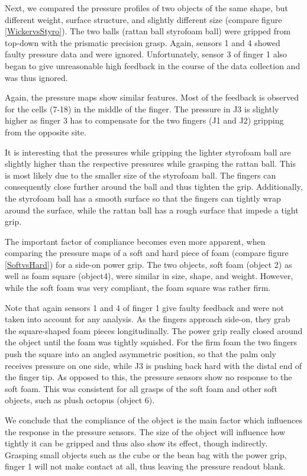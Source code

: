 Next, we compared the pressure profiles of two objects of the same shape, but different weight, surface structure, and slightly different size (compare figure \ref{WickervsStyro}). The two balls (rattan ball styrofoam ball) were gripped from top-down with the prismatic precision grasp. Again, sensors 1 and 4 showed faulty pressure data and were ignored. Unfortunately, sensor 3 of finger 1 also began to give unreasonable high feedback in the course of the data collection and was thus ignored. 

Again, the pressure maps show similar features. Most of the feedback is observed for the cells (7-18) in the middle of the finger. The pressure in J3 is slightly higher as finger 3 has to compensate for the two fingers (J1 and J2) gripping from the opposite site.  

It is interesting that the pressures while gripping the lighter styrofoam ball are slightly higher than the respective pressures while grasping the rattan ball. This is most likely due to the smaller size of the styrofoam ball. The fingers can consequently close further around the ball and thus tighten the grip. Additionally, the styrofoam ball has a smooth surface so that the fingers can tightly wrap around the surface, while the rattan ball has a rough surface that impede a tight grip.

The important factor of compliance becomes even more apparent, when comparing the pressure maps of a soft and hard piece of foam (compare figure \ref{SoftvsHard}) for a side-on power grip. The two objects, soft foam (object 2) as well as foam square (object4), were similar in size, shape, and weight. However, while the soft foam was very compliant, the foam square was rather firm. 

Note that again sensors 1 and 4 of finger 1 give faulty feedback and were not taken into account for any analysis. As the fingers approach side-on, they grab the square-shaped foam pieces longitudinally. The power grip really closed around the object until the foam was tightly squished. For the firm foam the two fingers push the square into an angled asymmetric position, so that the palm only receives pressure on one side, while J3 is pushing back hard with the distal end of the finger tip. As opposed to this, the pressure sensors show no response to the soft foam. This was consistent for all grasps of the soft foam and other soft objects, such as plush octopus (object 6). 

We conclude that the compliance of the object is the main factor which influences the response in the pressure sensors. The size of the object will influence how tightly it can be gripped and thus also show its effect, though indirectly. Grasping small objects such as the cube or the bean bag with the power grip, finger 1 will not make contact at all, thus leaving the pressure readout blank.

